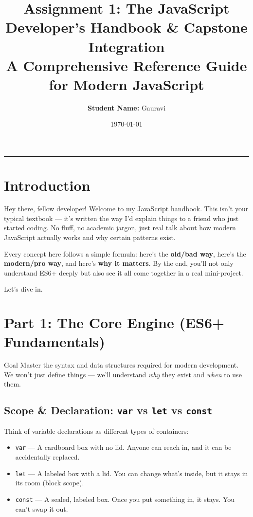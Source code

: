 \documentclass[12pt]{article}
\title{
    \vspace{-1cm}
    \textbf{\LARGE Assignment 1: The JavaScript Developer's Handbook \& Capstone Integration}\\[0.5cm]
    \large A Comprehensive Reference Guide for Modern JavaScript
}
\author{
    \textbf{Student Name:} Gauravi\\
}
\date{\today}
\begin{document}
\maketitle
\thispagestyle{fancy}

\begin{center}
\rule{0.8\textwidth}{0.4pt}
\end{center}

\section*{Introduction}

Hey there, fellow developer! Welcome to my JavaScript handbook. This isn't your typical textbook --- it's written the way I'd explain things to a friend who just started coding. No fluff, no academic jargon, just real talk about how modern JavaScript actually works and why certain patterns exist.

Every concept here follows a simple formula: here's the \textbf{old/bad way}, here's the \textbf{modern/pro way}, and here's \textbf{why it matters}. By the end, you'll not only understand ES6+ deeply but also see it all come together in a real mini-project.

Let's dive in.

\newpage

\section{Part 1: The Core Engine (ES6+ Fundamentals)}

\begin{conceptbox}{Goal}
Master the syntax and data structures required for modern development. We won't just define things --- we'll understand \textit{why} they exist and \textit{when} to use them.
\end{conceptbox}

\subsection{Scope \& Declaration: \texttt{var} vs \texttt{let} vs \texttt{const}}

Think of variable declarations as different types of containers:
\begin{itemize}[noitemsep]
    \item \texttt{var} --- A cardboard box with no lid. Anyone can reach in, and it can be accidentally replaced.
    \item \texttt{let} --- A labeled box with a lid. You can change what's inside, but it stays in its room (block scope).
    \item \texttt{const} --- A sealed, labeled box. Once you put something in, it stays. You can't swap it out.
\end{itemize}
\end{document}
